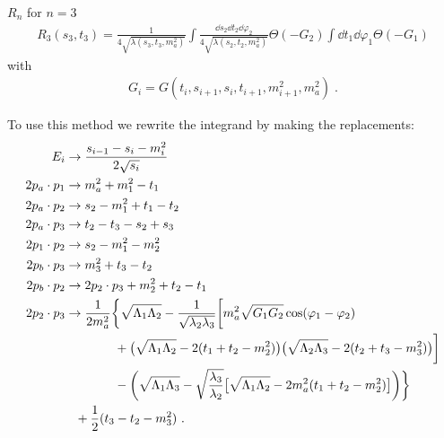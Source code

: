 \begin{bluenv}{$R_n$ for $n = 3$}
    \vspace{-3ex}
    \begin{align}
        R_3(s_3, t_3) 
            = \frac{1}{4\sqrt{\lambda(s_3, t_3, m_a^2)}}
              \int \frac{\dd s_2 \dd t_2 \dd \varphi_2}
                        {4 \sqrt{\lambda(s_2, t_2, m_a^2)}}
              \Theta(- G_2) 
              \int \dd t_1 \dd \varphi_1 \Theta(- G_1)
    \end{align}
    with 
    \begin{gather}
        G_i = G(t_i, s_{i+1}, s_i, t_{i+1}, m_{i+1}^2, m_a^2) \; .
    \end{gather}
\end{bluenv}

To use this method we rewrite the integrand by making the replacements:
\begin{align}
    E_i &\rightarrow \frac{s_{i-1} - s_i - m_i^2}{2\sqrt{s_i}} \\
    2 p_a \cdot p_1 &\rightarrow m_a^2 +  m_1^2 - t_1 \\
    2 p_a \cdot p_2 &\rightarrow s_2 - m_1^2 + t_1 - t_2 \\
    2 p_a \cdot p_3 &\rightarrow t_2 - t_3 - s_2 + s_3 \\
    2 p_1 \cdot p_2 &\rightarrow s_2 - m_1^2 - m_2^2 \\
    2p_b \cdot p_3 &\rightarrow m_3^2 + t_3 - t_2 \\
    2p_b \cdot p_2 &\rightarrow 2 p_2 \cdot p_3 + m_2^2 + t_2 - t_1 \\
    2 p_2 \cdot p_3 &\rightarrow 
        \frac{1}{2 m_a^2} 
        \bigg\{
        \sqrt{\Lambda_1 \Lambda_2}
                - 
                \frac{1}{\sqrt{\lambda_2 \lambda_3}}
                \bigg[
                    m_a^2 \sqrt{G_1 G_2} \cos (\varphi_1 - \varphi_2) \\
                    &\hphantom{=\frac{1}{4 m_a^2}\bigg\{} + 
                    \big(\sqrt{\Lambda_1 \Lambda_2} - 2 (t_1 + t_2 - m_2^2)\big)
                    \big(\sqrt{\Lambda_2 \Lambda_3} - 2 (t_2 + t_3 - m_3^2)\big)
                \bigg] \\
        &\hphantom{=\frac{1}{4 m_a^2}\bigg\{} -
        \bigg(
        \sqrt{\Lambda_1 \Lambda_3} - \sqrt{\frac{\lambda_3}{\lambda_2}} 
                \big[
                    \sqrt{\Lambda_1 \Lambda_2} - 2 m_a^2(t_1 + t_2 - m_2^2)
                \big]
        \bigg)
        \bigg\} \\
        &\hphantom{=}+
        \frac{1}{2}(t_3 - t_2 - m_3^2) \ .
\end{align}

